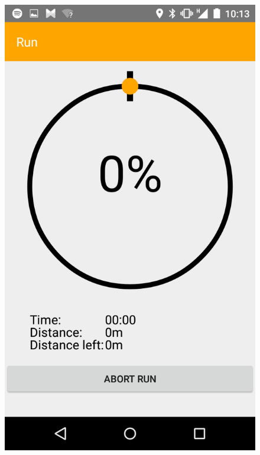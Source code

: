 \begin{figure}
\centering
\begin{minipage}{.4\textwidth}
  \centering
  \includegraphics[width=.8\linewidth]{abb/bsp/bsp11}
  \label{fig:bsp11}
\end{minipage}
\begin{minipage}{.4\textwidth}
  \centering

\end{minipage}
\end{figure}
